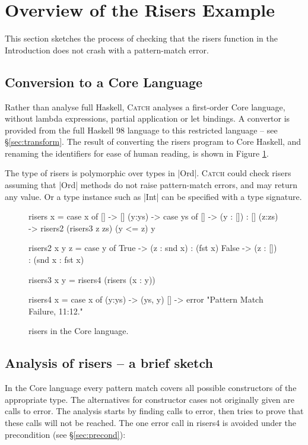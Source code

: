 \documentclass[preprint]{sigplanconf}
\newcommand{\C}[1]{\textsf{#1}}
\newcommand{\catch}{\textsc{Catch}}
\begin{document}
\section{Overview of the Risers Example}
\label{sec:walkthrough}

This section sketches the process of checking that the \C{risers} function in the Introduction does not crash with a pattern-match error.


\subsection{Conversion to a Core Language}

Rather than analyse full Haskell, \catch{} analyses a first-order Core language, without lambda expressions, partial application or let bindings. A convertor is provided from the full Haskell 98 language to this restricted language -- see \S\ref{sec:transform}. The result of converting the \C{risers} program to Core Haskell, and renaming the identifiers for ease of human reading, is shown in Figure \ref{fig:risers_core}.

The type of \C{risers} is polymorphic over types in |Ord|. \catch{} could check \C{risers} assuming that |Ord| methods do not raise pattern-match errors, and may return any value. Or a type instance such as |Int| can be specified with a type signature.

\begin{figure}
\begin{code}
risers x = case x of
    [] -> []
    (y:ys) ->  case ys of
         [] -> (y : []) : []
         (z:zs) -> risers2 (risers3 z zs) (y <= z) y

risers2 x y z =  case y of
    True -> (z : snd x) : (fst x)
    False -> (z : []) : (snd x : fst x)

risers3 x y = risers4 (risers (x : y))

risers4 x = case x of
    (y:ys) -> (ys, y)
    [] -> error "Pattern Match Failure, 11:12."
\end{code}
\caption{\C{risers} in the Core language.}
\label{fig:risers_core}
\end{figure}

\subsection{Analysis of \C{risers} -- a brief sketch}

In the Core language every pattern match covers all possible constructors of the appropriate type. The alternatives for constructor cases not originally given are calls to \C{error}. The analysis starts by finding calls to \C{error}, then tries to prove that these calls will not be reached. The one \C{error} call in \C{risers4} is avoided under the precondition (see \S\ref{sec:precond}):
\end{document}
